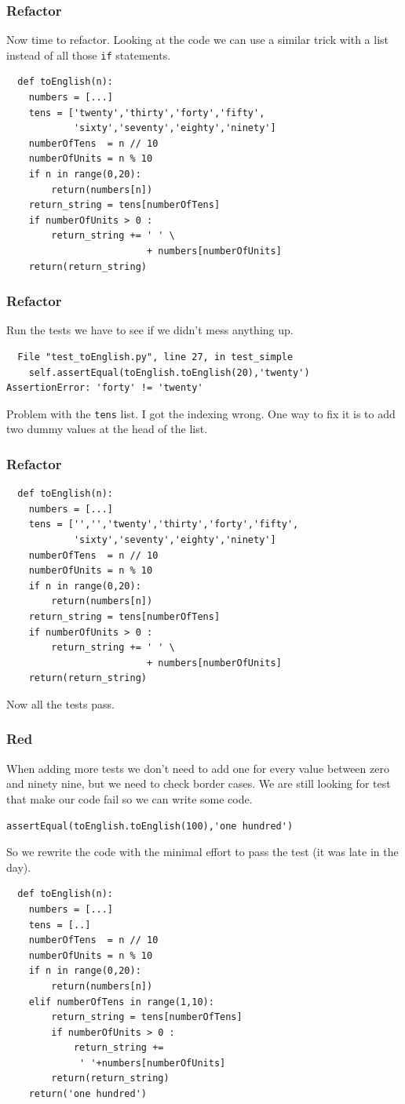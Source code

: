 \documentclass{beamer}
\begin{document}
\begin{frame}[fragile]
\frametitle{Refactor}
Now time to refactor. Looking at the code we can use a similar trick
with a list instead of all those {\tt if} statements.
\begin{lstlisting}
  def toEnglish(n):
    numbers = [...]
    tens = ['twenty','thirty','forty','fifty',
            'sixty','seventy','eighty','ninety']
    numberOfTens  = n // 10
    numberOfUnits = n % 10
    if n in range(0,20):
        return(numbers[n])
    return_string = tens[numberOfTens]
    if numberOfUnits > 0 :
        return_string += ' ' \
                         + numbers[numberOfUnits]
    return(return_string)
\end{lstlisting}
\end{frame}
\begin{frame}[fragile]
  \frametitle{Refactor}
Run the tests we have to see if we didn't mess anything up.
\begin{verbatim}
  File "test_toEnglish.py", line 27, in test_simple
    self.assertEqual(toEnglish.toEnglish(20),'twenty')
AssertionError: 'forty' != 'twenty'
\end{verbatim}
Problem with the {\tt tens} list. I got the indexing wrong. One way to
fix it is to add two dummy values at the head of the list.
\end{frame}
\begin{frame}[fragile]
\frametitle{Refactor}
\begin{lstlisting}
  def toEnglish(n):
    numbers = [...]
    tens = ['','','twenty','thirty','forty','fifty',
            'sixty','seventy','eighty','ninety']
    numberOfTens  = n // 10
    numberOfUnits = n % 10
    if n in range(0,20):
        return(numbers[n])
    return_string = tens[numberOfTens]
    if numberOfUnits > 0 :
        return_string += ' ' \
                         + numbers[numberOfUnits]
    return(return_string)
\end{lstlisting}  
Now all the tests pass.
\end{frame}
\begin{frame}[fragile]
\frametitle{Red}
When adding more tests we don't need to add one for every value between
zero and ninety nine, but we need to check border cases. We are still
looking for test that make our code fail so we can write some code.
\begin{lstlisting}
assertEqual(toEnglish.toEnglish(100),'one hundred')
\end{lstlisting}
\end{frame}
\begin{frame}[fragile]
So we rewrite the code with the minimal effort to pass the test (it
was late in the day).
\begin{lstlisting}
  def toEnglish(n):
    numbers = [...]
    tens = [..] 
    numberOfTens  = n // 10
    numberOfUnits = n % 10
    if n in range(0,20):
        return(numbers[n])
    elif numberOfTens in range(1,10):
        return_string = tens[numberOfTens]
        if numberOfUnits > 0 :
            return_string += 
             ' '+numbers[numberOfUnits]
        return(return_string)
    return('one hundred')
\end{lstlisting}
\end{frame}
\end{document}
